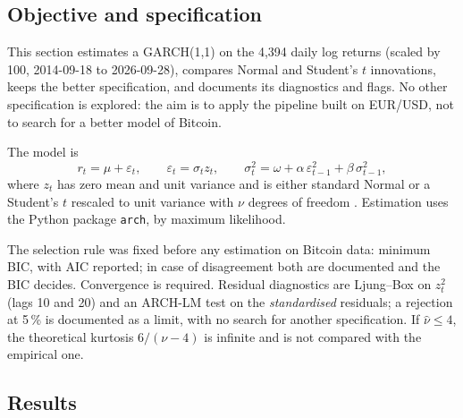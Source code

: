 \documentclass[12pt,a4paper]{article}
\begin{document}
\subsection{Objective and specification}

This section estimates a GARCH(1,1) on the 4,394 daily log returns (scaled by 100, 2014-09-18 to 2026-09-28), compares Normal and Student's $t$ innovations, keeps the better specification, and documents its diagnostics and flags. No other specification is explored: the aim is to apply the pipeline built on EUR/USD, not to search for a better model of Bitcoin.

The model is
\begin{equation}
	r_t = \mu + \varepsilon_t, \qquad \varepsilon_t = \sigma_t z_t, \qquad
	\sigma_t^2 = \omega + \alpha\,\varepsilon_{t-1}^2 + \beta\,\sigma_{t-1}^2,
\end{equation}
where $z_t$ has zero mean and unit variance and is either standard Normal or a Student's $t$ rescaled to unit variance with $\nu$ degrees of freedom \citep{engle1982,bollerslev1986,bollerslev1987}. Estimation uses the Python package \texttt{arch}, by maximum likelihood.

The selection rule was fixed before any estimation on Bitcoin data: minimum BIC, with AIC reported; in case of disagreement both are documented and the BIC decides. Convergence is required. Residual diagnostics are Ljung--Box on $z_t^2$ (lags 10 and 20) and an ARCH-LM test on the \emph{standardised} residuals; a rejection at 5\,\% is documented as a limit, with no search for another specification. If $\hat\nu \le 4$, the theoretical kurtosis $6/(\nu-4)$ is infinite and is not compared with the empirical one.

\subsection{Results}
\end{document}
